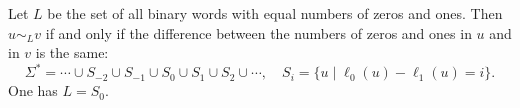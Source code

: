 

\setcounter{section}{4}
\setcounter{subsection}{1}
\setcounter{dfn}{5}

\begin{exl}
Let $L$ be the set of all binary words with equal numbers of zeros and ones.
Then $u \sim_L v$ if and only if the difference between the numbers of zeros and ones in $u$ and in $v$ is the same:
\[
\Sigma^* = \cdots \cup S_{-2} \cup S_{-1} \cup S_0 \cup S_1 \cup S_2 \cup \cdots, \quad S_i = \{u \mid \ell_0(u) - \ell_1(u) = i\}.
\]
One has $L = S_0$.
\end{exl}

